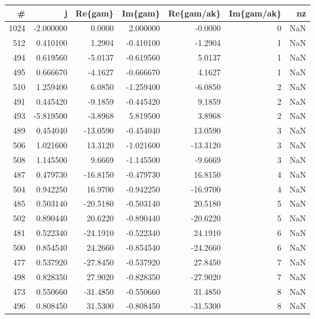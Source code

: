 \begin{tabular}{rrrrrrr}
\toprule
   \# &           j &   Re\{gam\} &     Im\{gam\} &  Re\{gam/ak\} &  Im\{gam/ak\} &  nz \\
\midrule
1024 &   -2.000000 &    0.0000 &    2.000000 &     -0.0000 &           0 & NaN \\
 512 &    0.410100 &    1.2904 &   -0.410100 &     -1.2904 &           1 & NaN \\
 494 &    0.619560 &   -5.0137 &   -0.619560 &      5.0137 &           1 & NaN \\
 495 &    0.666670 &   -4.1627 &   -0.666670 &      4.1627 &           1 & NaN \\
 510 &    1.259400 &    6.0850 &   -1.259400 &     -6.0850 &           2 & NaN \\
 491 &    0.445420 &   -9.1859 &   -0.445420 &      9.1859 &           2 & NaN \\
 493 &   -5.819500 &   -3.8968 &    5.819500 &      3.8968 &           2 & NaN \\
 489 &    0.454040 &  -13.0590 &   -0.454040 &     13.0590 &           3 & NaN \\
 506 &    1.021600 &   13.3120 &   -1.021600 &    -13.3120 &           3 & NaN \\
 508 &    1.145500 &    9.6669 &   -1.145500 &     -9.6669 &           3 & NaN \\
 487 &    0.479730 &  -16.8150 &   -0.479730 &     16.8150 &           4 & NaN \\
 504 &    0.942250 &   16.9700 &   -0.942250 &    -16.9700 &           4 & NaN \\
 485 &    0.503140 &  -20.5180 &   -0.503140 &     20.5180 &           5 & NaN \\
 502 &    0.890440 &   20.6220 &   -0.890440 &    -20.6220 &           5 & NaN \\
 481 &    0.522340 &  -24.1910 &   -0.522340 &     24.1910 &           6 & NaN \\
 500 &    0.854540 &   24.2660 &   -0.854540 &    -24.2660 &           6 & NaN \\
 477 &    0.537920 &  -27.8450 &   -0.537920 &     27.8450 &           7 & NaN \\
 498 &    0.828350 &   27.9020 &   -0.828350 &    -27.9020 &           7 & NaN \\
 473 &    0.550660 &  -31.4850 &   -0.550660 &     31.4850 &           8 & NaN \\
 496 &    0.808450 &   31.5300 &   -0.808450 &    -31.5300 &           8 & NaN \\

\end{tabular}
